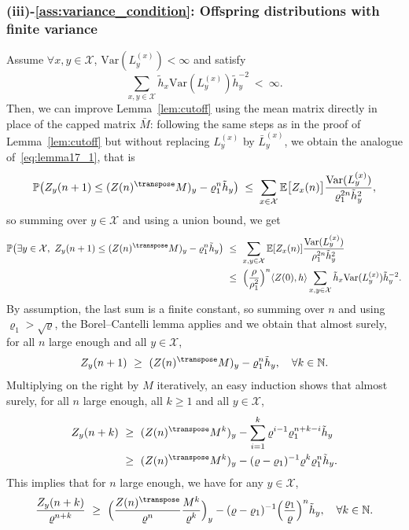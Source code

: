 \begin{refsegment}
\subsubsection*{(iii)-\ref{ass:variance_condition}: Offspring distributions with finite variance}
Assume $\forall x,y\in \mathcal{X}$, $\mathrm{Var}(L_y^{(x)})<\infty$ and satisfy
\begin{equation*}
  \sum_{x,y\in \mathcal{X}}\tilde{h}_x \mathrm{Var}(L_y^{(x)}) \tilde{h}_y^{-2}\ <\ \infty.
\end{equation*}
%
Then, we can improve Lemma~\ref{lem:cutoff} using the mean matrix directly in place of the capped matrix $\bar{M}$:
following the same steps as in the proof of
Lemma~\ref{lem:cutoff} but without replacing $L^{(x)}_y$ by $\bar{L}^{(x)}_y$, we obtain the analogue of~\eqref{eq:lemma17_1}, that is
\[
\mathbb{P}\big(Z_y(n+1)\leq (Z(n)^\transpose M)_y - \varrho_1^n\tilde{h}_y\big) \; \leq \; \sum_{x\in\mathcal{X} }\mathbb{E}\big[Z_x(n)\big]\frac{\mathrm{Var}(L^{(x)}_y)}{\varrho_1^{2n}\tilde{h}^2_y},
\]
so summing over $y\in \mathcal{X}$ and using a union bound, we get
\begin{align*}
  \mathbb{P}\big(\exists y\in\mathcal{X},\ Z_y(n+1)\leq (Z(n)^\transpose M)_y - \varrho_1^n\tilde{h}_y\big)
 \ & \leq\ \sum_{x,y\in \mathcal{X}} \mathbb{E}[Z_x(n)] \frac{\mathrm{Var}(L_{y}^{(x)})}{\rho_1^{2n}\tilde{h}_y^2} \\
 &\leq\ \Big(\frac{\rho}{\rho_1^2}\Big)^n \langle Z(0),h\rangle \sum_{x,y\in \mathcal{X}} \tilde{h}_x\mathrm{Var}(L_{y}^{(x)})\tilde{h}_y^{- 2}.
\end{align*}
By assumption, the last sum is a finite constant, so summing over $n$ and using $\varrho_1>\sqrt{\varrho}$, the Borel--Cantelli lemma applies and we obtain that almost surely, for all $n$ large enough and all
$y\in \mathcal{X}$,
\[
  Z_y(n+1)\ \geq\ (Z(n)^\transpose M)_y - \varrho^n_1\tilde{h}_y,\quad \forall k\in\mathbb{N}.
\]
Multiplying on the right by $M$ iteratively, an easy induction shows that almost surely, for all $n$ large enough, all $k\geq 1$ and all
$y\in \mathcal{X}$,
\begin{align*}
  Z_y(n+k)\ &\geq\ (Z(n)^\transpose M^k)_y - \sum_{i=1}^k \varrho^{i-1} \varrho_1^{n+k-i} \tilde{h}_y\\
  &\geq\ (Z(n)^\transpose M^k)_y - (\varrho-\varrho_1)^{-1}\varrho^k\varrho^n_1\tilde{h}_y.
\end{align*}
%
This implies that for $n$ large enough, we have for any $y\in \mathcal{X}$,
\[
\frac{Z_y(n+k)}{\varrho^{n+k}}\ \geq\ \Big(\frac{Z(n)^\transpose}{\varrho^n} \frac{M^k}{\varrho^k}\Big)_y- (\varrho-\varrho_1)^{-1}\Big(\frac{\varrho_1}{\varrho}\Big)^n\tilde{h}_y,\quad \forall k\in\mathbb{N}.
\]
\end{refsegment}
